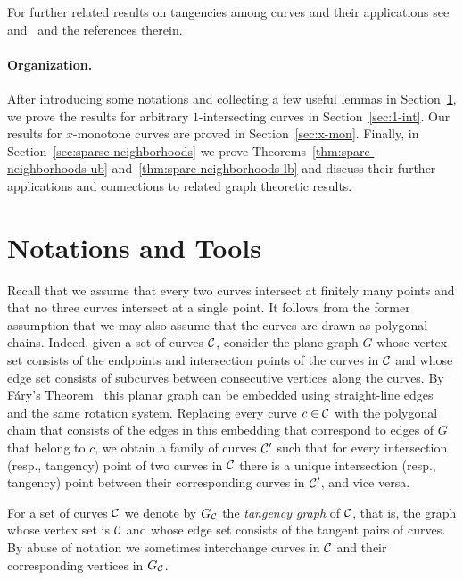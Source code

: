 \documentclass[11pt]{article}
\theoremstyle{definition}
\def\C{{\cal C}}
\begin{document}
For further related results on tangencies among curves and their applications see~\cite{lenses} and~\cite{PRT18} and the references therein.

\paragraph{Organization.}
After introducing some notations and collecting a few useful lemmas in Section~\ref{sec:tools}, we prove the results for arbitrary $1$-intersecting curves in Section~\ref{sec:1-int}.
Our results for $x$-monotone curves are proved in Section~\ref{sec:x-mon}.
Finally, in Section~\ref{sec:sparse-neighborhoods} we prove Theorems~\ref{thm:spare-neighborhoods-ub} and~\ref{thm:spare-neighborhoods-lb} and discuss their further applications and connections to related graph theoretic results.


\section{Notations and Tools}
\label{sec:tools}

Recall that we assume that every two curves intersect at finitely many points and that no three curves intersect at a single point.
It follows from the former assumption that we may also assume that the curves are drawn as polygonal chains.
Indeed, given a set of curves $\C$, consider the plane graph $G$ whose vertex set consists of the endpoints and intersection points of the curves in $\C$ and whose edge set consists of subcurves between consecutive vertices along the curves.
By F\'ary's Theorem~\cite{Fary} this planar graph can be embedded using straight-line edges and the same rotation system.
Replacing every curve $c \in \C$ with the polygonal chain that consists of the edges in this embedding that correspond to edges of $G$ that belong to $c$, we obtain a family of curves $\C'$ such that for every intersection (resp., tangency) point of two curves in $\C$ there is a unique intersection (resp., tangency) point between their corresponding curves in $\C'$, and vice versa.

For a set of curves $\C$ we denote by $G_\C$ the \emph{tangency graph} of $\C$, that is, the graph whose vertex set is $\C$ and whose edge set consists of the tangent pairs of curves.
By abuse of notation we sometimes interchange curves in $\C$ and their corresponding vertices in $G_\C$.
\end{document}
